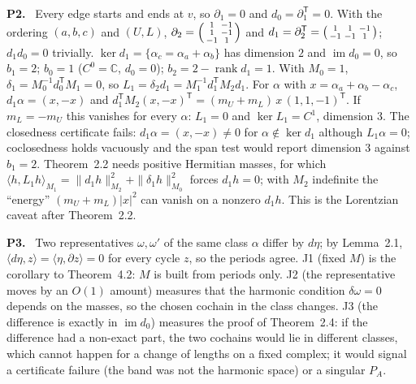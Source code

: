 \documentclass[11pt]{article}
\newcommand{\C}{\mathbb{C}}
\newcommand{\im}{\operatorname{im}}
\newcommand{\rank}{\operatorname{rank}}
\newenvironment{solution}[1]{\medskip\noindent\textbf{P#1.}\ }{\par\medskip}
\begin{document}
\begin{solution}{2}
Every edge starts and ends at $v$, so $\partial_1 = 0$ and $d_0 = \partial_1^{\mathsf T} = 0$.
With the ordering $(a,b,c)$ and $(U,L)$, $\partial_2 = \begin{psmallmatrix}1&-1\\1&-1\\-1&1\end{psmallmatrix}$
and $d_1 = \partial_2^{\mathsf T} = \begin{psmallmatrix}1&1&-1\\-1&-1&1\end{psmallmatrix}$;
$d_1d_0 = 0$ trivially. $\ker d_1 = \{\alpha_c = \alpha_a+\alpha_b\}$ has
dimension $2$ and $\im d_0 = 0$, so $b_1 = 2$; $b_0 = 1$ ($C^0 = \C$, $d_0 = 0$);
$b_2 = 2-\rank d_1 = 1$. With $M_0 = 1$, $\delta_1 = M_0^{-1}d_0^{\mathsf T}M_1 = 0$,
so $L_1 = \delta_2d_1 = M_1^{-1}d_1^{\mathsf T}M_2d_1$. For $\alpha$ with
$x = \alpha_a+\alpha_b-\alpha_c$, $d_1\alpha = (x,-x)$ and
$d_1^{\mathsf T}M_2(x,-x)^{\mathsf T} = (m_U+m_L)\,x\,(1,1,-1)^{\mathsf T}$. If
$m_L = -m_U$ this vanishes for every $\alpha$: $L_1 = 0$ and $\ker L_1 = C^1$,
dimension $3$. The closedness certificate fails: $d_1\alpha = (x,-x)\ne0$ for
$\alpha\notin\ker d_1$ although $L_1\alpha = 0$; coclosedness holds vacuously
and the span test would report dimension $3$ against $b_1 = 2$. Theorem~2.2
needs positive Hermitian masses, for which $\langle h,L_1h\rangle_{M_1} = \|d_1h\|^2_{M_2}+\|\delta_1h\|^2_{M_0}$
forces $d_1h = 0$; with $M_2$ indefinite the ``energy'' $(m_U+m_L)|x|^2$ can
vanish on a nonzero $d_1h$. This is the Lorentzian caveat after Theorem~2.2.
\end{solution}

\begin{solution}{3}
Two representatives $\omega,\omega'$ of the same class $\alpha$ differ by
$d\eta$; by Lemma~2.1, $\langle d\eta,z\rangle = \langle\eta,\partial z\rangle = 0$
for every cycle $z$, so the periods agree. J1 (fixed $M$) is the corollary to
Theorem~4.2: $M$ is built from periods only. J2 (the representative moves by
an $O(1)$ amount) measures that the harmonic condition $\delta\omega = 0$ depends
on the masses, so the chosen cochain in the class changes. J3 (the difference
is exactly in $\im d_0$) measures the proof of Theorem~2.4: if the difference
had a non-exact part, the two cochains would lie in different classes, which
cannot happen for a change of lengths on a fixed complex; it would signal a
certificate failure (the band was not the harmonic space) or a singular $P_A$.
\end{solution}
\end{document}
